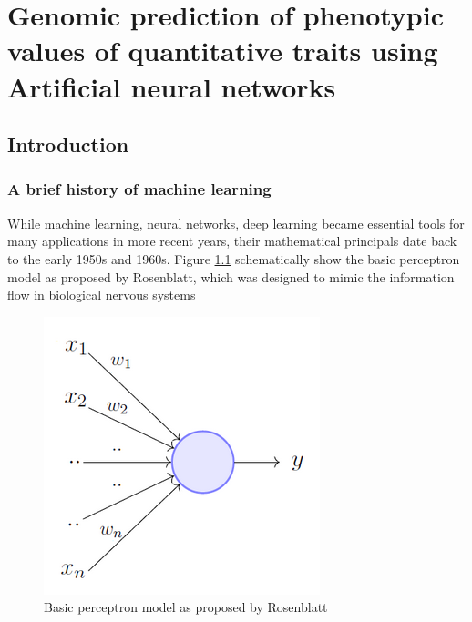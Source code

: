 \chapter{Genomic prediction of phenotypic values of quantitative traits using Artificial neural networks}

\label{Chapter3} %




\section{Introduction}
\subsection{A brief history of machine learning }

While machine learning, neural networks, deep learning became essential tools for many applications in more
recent years, their mathematical principals date back to the early 1950s and 1960s. Figure
\ref{fig:perceptron} schematically show the basic perceptron model as proposed by Rosenblatt, which was
designed to mimic the information flow in biological nervous systems \cite{rosenblatt1961}

\begin{figure}[th]
  \centering \includegraphics[height=.25\textheight, width=.5\textwidth]{Figures/perceptron.png} \decoRule
\caption[Basic perceptron model]{Basic perceptron model as proposed by Rosenblatt}
\label{fig:perceptron}
\end{figure}

